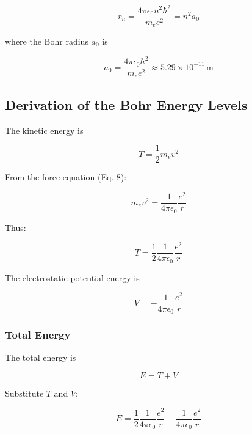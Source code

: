 \documentclass[
	a4paper,
	parskip=half,
    pagesize=auto,      		%
    listof=totoc,   		%
    bibliography=totoc,
	11pt
]{scrartcl}
\begin{document}
\begin{equation}
	r_n =
	\frac{4\pi\epsilon_0 n^2 \hbar^2}{m_e e^2} = n^2 a_0
\end{equation}

where the Bohr radius $a_0$ is

\begin{equation}
	a_0 =
	\frac{4\pi\epsilon_0 \hbar^2}{m_e e^2}
	\approx 5.29 \times 10^{-11}\,\mathrm{m}
\end{equation}


\subsection{Derivation of the Bohr Energy Levels}

The kinetic energy is

\begin{equation}
	T = \frac{1}{2}m_e v^2
\end{equation}

From the force equation (Eq. 8):

\begin{equation}
	m_e v^2
	=
	\frac{1}{4\pi\epsilon_0}\frac{e^2}{r}
\end{equation}

Thus:

\begin{equation}
	T
	=
	\frac{1}{2}
	\frac{1}{4\pi\epsilon_0}
	\frac{e^2}{r}
\end{equation}

The electrostatic potential energy is

\begin{equation}
	V
	=
	-
	\frac{1}{4\pi\epsilon_0}
	\frac{e^2}{r}
\end{equation}

\subsubsection*{Total Energy}

The total energy is

\begin{equation}
	E = T + V
\end{equation}

Substitute $T$ and $V$:

\begin{equation}
	E
	=
	\frac{1}{2}
	\frac{1}{4\pi\epsilon_0}
	\frac{e^2}{r}
	-
	\frac{1}{4\pi\epsilon_0}
	\frac{e^2}{r}
\end{equation}
\end{document}
